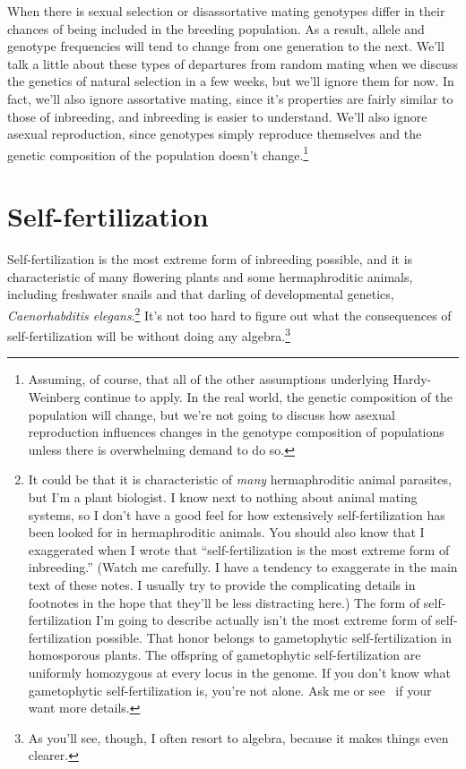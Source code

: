 \documentclass[12pt]{article}
\begin{document}
When there is sexual selection or disassortative mating genotypes
differ in their chances of being included in the breeding
population. As a result, allele and genotype frequencies will tend to
change from one generation to the next. We'll talk a little about
these types of departures from random mating when we discuss the
genetics of natural selection in a few weeks, but we'll ignore them
for now. In fact, we'll also ignore assortative mating, since it's
properties are fairly similar to those of inbreeding, and inbreeding
is easier to understand. We'll also ignore asexual reproduction, since
genotypes simply reproduce themselves and the genetic composition of
the population doesn't change.\footnote{Assuming, of course, that all
  of the other assumptions underlying Hardy-Weinberg continue to
  apply. In the real world, the genetic composition of the population
  will change, but we're not going to discuss how asexual reproduction
  influences changes in the genotype composition of populations unless
  there is overwhelming demand to do so.}

\section*{Self-fertilization}

Self-fertilization is the most extreme form of inbreeding
possible,
and it is characteristic of many flowering plants and some
hermaphroditic animals, including freshwater snails and that darling
of developmental genetics, {\it Caenorhabditis elegans}.\footnote{It
  could be that it is characteristic of {\it many\/} hermaphroditic
  animal parasites, but I'm a plant biologist. I know next to nothing
  about animal mating systems, so I don't have a good feel for how
  extensively self-fertilization has been looked for in hermaphroditic
  animals. You should also know that I exaggerated when I wrote that
  ``self-fertilization is the most extreme form of inbreeding.''
  (Watch me carefully. I have a tendency to exaggerate in the main
  text of these notes. I usually try to provide the complicating
  details in footnotes in the hope that they'll be less distracting
  here.) The form of self-fertilization I'm going to describe actually
  isn't the most extreme form of self-fertilization possible. That
  honor belongs to gametophytic self-fertilization in homosporous
  plants. The offspring of gametophytic self-fertilization are
  uniformly homozygous at every locus in the genome. If you don't know
  what gametophytic self-fertilization is, you're not alone. Ask me or
  see~\cite{Holsinger-1990} if your want more details.} It's not too
hard to figure out what the consequences of self-fertilization will be
without doing any algebra.\footnote{As you'll see, though, I often
  resort to algebra, because it makes things even clearer.}
\end{document}
